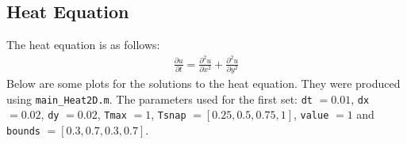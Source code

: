 \documentclass[]{article}
\def\incode#1{\texttt{#1}}
\begin{document}
	\subsection{Heat Equation}
	The heat equation is as follows:
	\begin{align}
		\frac{\partial u}{\partial t} = \frac{\partial^2 u}{\partial x^2} + \frac{\partial^2 u}{\partial y^2}
	\end{align}
	Below are some plots for the solutions to the heat equation. They were produced using \incode{main\_Heat2D.m}. The parameters used for the first set: \incode{dt} $= 0.01$, \incode{dx} $= 0.02$, \incode{dy} $= 0.02$, \incode{Tmax} $= 1$, \incode{Tsnap} $= [0.25, 0.5, 0.75, 1]$, \incode{value} $= 1$ and \incode{bounds} $= [0.3, 0.7, 0.3, 0.7]$. 
	
	\begin{figure}[htbp]
		\centering
		

\end{figure}
\end{document}

